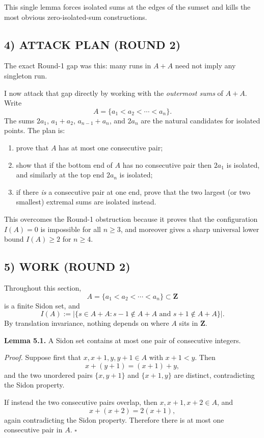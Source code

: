 \medskip
This single lemma forces isolated sums at the edges of the sumset and kills the most obvious zero-isolated-sum constructions.

\subsection*{4) ATTACK PLAN (ROUND 2)}
The exact Round-1 gap was this: many runs in $A+A$ need not imply any singleton run.

I now attack that gap directly by working with the \emph{outermost sums} of $A+A$.
Write
\[
A=\{a_1<a_2<\cdots<a_n\}.
\]
The sums $2a_1$, $a_1+a_2$, $a_{n-1}+a_n$, and $2a_n$ are the natural candidates for isolated points.  The plan is:
\begin{enumerate}
\item prove that $A$ has at most one consecutive pair;
\item show that if the bottom end of $A$ has no consecutive pair then $2a_1$ is isolated, and similarly at the top end $2a_n$ is isolated;
\item if there \emph{is} a consecutive pair at one end, prove that the two largest (or two smallest) extremal sums are isolated instead.
\end{enumerate}
This overcomes the Round-1 obstruction because it proves that the configuration $I(A)=0$ is impossible for all $n\ge 3$, and moreover gives a sharp universal lower bound $I(A)\ge 2$ for $n\ge 4$.

\subsection*{5) WORK (ROUND 2)}
Throughout this section,
\[
A=\{a_1<a_2<\cdots<a_n\}\subset \mathbf Z
\]
is a finite Sidon set, and
\[
I(A):=\bigl|\{s\in A+A: s-1\notin A+A\text{ and }s+1\notin A+A\}\bigr|.
\]
By translation invariance, nothing depends on where $A$ sits in $\mathbf Z$.

\medskip
\noindent\textbf{Lemma 5.1.}
A Sidon set contains at most one pair of consecutive integers.

\smallskip
\noindent\emph{Proof.}
Suppose first that $x,x+1,y,y+1\in A$ with $x+1<y$.  Then
\[
x+(y+1)=(x+1)+y,
\]
and the two unordered pairs $\{x,y+1\}$ and $\{x+1,y\}$ are distinct, contradicting the Sidon property.

If instead the two consecutive pairs overlap, then $x,x+1,x+2\in A$, and
\[
x+(x+2)=2(x+1),
\]
again contradicting the Sidon property.  Therefore there is at most one consecutive pair in $A$. \hfill$\square$

